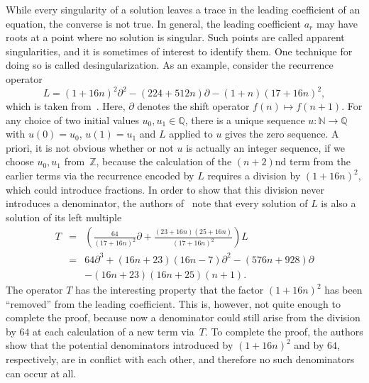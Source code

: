 \documentclass{sig-alternate}
\newcommand{\bN} { {\mathbb{N}}}
\newcommand{\bQ} { {\mathbb{Q}}}
\newcommand{\bZ} { {\mathbb{Z}}}
\newcommand{\pa}{\partial}
\begin{document}
While every singularity of a solution leaves a trace in the
leading coefficient of an equation, the converse is not true. In
general, the leading coefficient $a_r$ may have roots at a point where no solution is singular. Such points are called
apparent singularities, and it is sometimes of interest to
identify them. One technique for doing so is called desingularization.
As an example, consider the recurrence operator
\[
 L = (1 + 16 n)^2 \pa^2 - (224 + 512 n) \pa - (1 + n)(17 + 16 n)^2,
\]
which is taken from~\cite[Section 4.1]{Abramov2006}.
Here, $\pa$ denotes the shift operator $f(n) \mapsto f(n + 1)$.
For any choice of two initial values
$u_0,u_1\in  \bQ$, there is a unique sequence $u \colon
\bN \to \bQ$ with $u(0)=u_0$, $u(1)=u_1$ and $L$ applied to $u$
gives the zero sequence. A priori, it is not obvious whether or
not $u$ is actually an integer sequence, if we choose $u_0,u_1$
from~$\bZ$, because the calculation of the $(n+2)$nd term
from the earlier terms via the recurrence encoded by $L$ requires
a division by $(1+16n)^2$, which could introduce fractions. In order
to show that this division never introduces a denominator, the
authors of~\cite{Abramov2006} note that every solution of $L$ is also a solution
of its left multiple
\begin{eqnarray*}
  T & = & \left( \frac{64}{(17 + 16 n)^2} \pa + \frac{(23 + 16 n)(25 + 16 n)}{(17 + 16 n)^2} \right) L \\
    & = & 64 \pa^3 + (16 n + 23) (16 n - 7) \pa^2 - (576 n + 928) \pa\\
    &   & - (16 n + 23) (16 n + 25)(n + 1).
\end{eqnarray*}
The operator $T$ has the interesting property that the factor
$(1+16n)^2$ has been ``removed'' from the leading
coefficient. This is, however, not quite enough to complete the
proof, because now a denominator could still arise from
the division by $64$ at each calculation of a new term via~$T$. To
complete the proof, the authors show that the potential denominators
introduced by $(1+16n)^2$ and by $64$, respectively, are in
conflict with each other, and therefore no such denominators can
occur at all.
\end{document}
